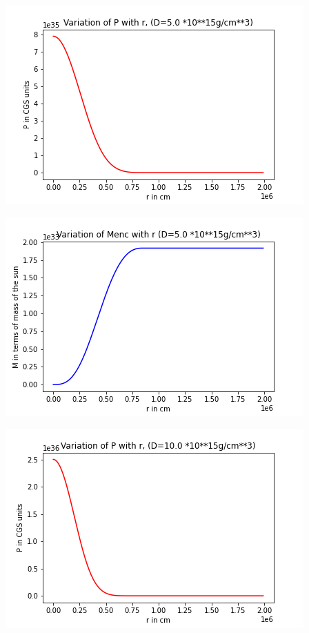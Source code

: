 \documentclass{article}
\begin{document}
\begin{center}
\begin{multicols}{2}
\begin{center}
       \end{center}
\end{multicols}
\begin{multicols}{2}
	\begin{center}
        \includegraphics[scale=0.4]{Images/Pr_pb2_3}
        \end{center}
\columnbreak
\begin{center}
       \includegraphics[scale=0.4]{Images/Mr_pb2_3}
       \end{center}
\end{multicols}
\begin{multicols}{2}
	\begin{center}
        \includegraphics[scale=0.4]{Images/Pr_pb2_4}

\end{center}
\end{multicols}
\end{center}
\end{document}
